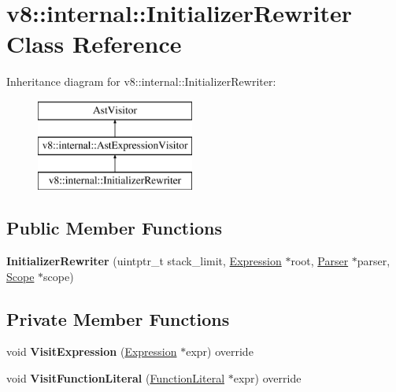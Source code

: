 \hypertarget{classv8_1_1internal_1_1_initializer_rewriter}{}\section{v8\+:\+:internal\+:\+:Initializer\+Rewriter Class Reference}
\label{classv8_1_1internal_1_1_initializer_rewriter}
Inheritance diagram for v8\+:\+:internal\+:\+:Initializer\+Rewriter\+:\begin{figure}[H]
\begin{center}
\leavevmode
\includegraphics[height=3.000000cm]{classv8_1_1internal_1_1_initializer_rewriter}
\end{center}
\end{figure}
\subsection*{Public Member Functions}
\begin{DoxyCompactItemize}
\item 
{\bfseries Initializer\+Rewriter} (uintptr\+\_\+t stack\+\_\+limit, \hyperlink{classv8_1_1internal_1_1_expression}{Expression} $\ast$root, \hyperlink{classv8_1_1internal_1_1_parser}{Parser} $\ast$parser, \hyperlink{classv8_1_1internal_1_1_scope}{Scope} $\ast$scope)\hypertarget{classv8_1_1internal_1_1_initializer_rewriter_af1b069e6186f6adc4c5575616d917475}{}\label{classv8_1_1internal_1_1_initializer_rewriter_af1b069e6186f6adc4c5575616d917475}

\end{DoxyCompactItemize}
\subsection*{Private Member Functions}
\begin{DoxyCompactItemize}
\item 
void {\bfseries Visit\+Expression} (\hyperlink{classv8_1_1internal_1_1_expression}{Expression} $\ast$expr) override\hypertarget{classv8_1_1internal_1_1_initializer_rewriter_a11dc30b0a07733c5f38cfe65ecef059a}{}\label{classv8_1_1internal_1_1_initializer_rewriter_a11dc30b0a07733c5f38cfe65ecef059a}

\item 
void {\bfseries Visit\+Function\+Literal} (\hyperlink{classv8_1_1internal_1_1_function_literal}{Function\+Literal} $\ast$expr) override\hypertarget{classv8_1_1internal_1_1_initializer_rewriter_adaa24a81a8b5d01fb93fbb2f7baeb767}{}\label{classv8_1_1internal_1_1_initializer_rewriter_adaa24a81a8b5d01fb93fbb2f7baeb767}

\end{DoxyCompactItemize}
